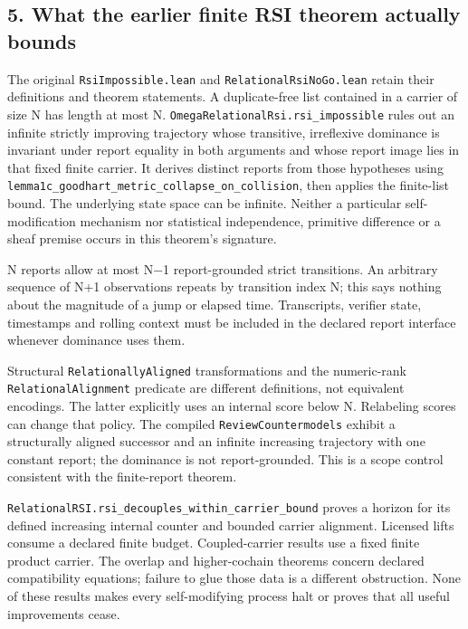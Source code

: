 \documentclass[
  10pt,
]{article}
\begin{document}
\subsection{5. What the earlier finite RSI theorem actually bounds}\label{what-the-earlier-finite-rsi-theorem-actually-bounds}

The original \texttt{RsiImpossible.lean} and \texttt{RelationalRsiNoGo.lean} retain their definitions and theorem statements. A duplicate-free list contained in a carrier of size N has length at most N. \texttt{OmegaRelationalRsi.rsi\_impossible} rules out an infinite strictly improving trajectory whose transitive, irreflexive dominance is invariant under report equality in both arguments and whose report image lies in that fixed finite carrier. It derives distinct reports from those hypotheses using \texttt{lemma1c\_goodhart\_metric\_collapse\_on\_collision}, then applies the finite-list bound. The underlying state space can be infinite. Neither a particular self-modification mechanism nor statistical independence, primitive difference or a sheaf premise occurs in this theorem's signature.

N reports allow at most N−1 report-grounded strict transitions. An arbitrary sequence of N+1 observations repeats by transition index N; this says nothing about the magnitude of a jump or elapsed time. Transcripts, verifier state, timestamps and rolling context must be included in the declared report interface whenever dominance uses them.

Structural \texttt{RelationallyAligned} transformations and the numeric-rank \texttt{RelationalAlignment} predicate are different definitions, not equivalent encodings. The latter explicitly uses an internal score below N. Relabeling scores can change that policy. The compiled \texttt{ReviewCountermodels} exhibit a structurally aligned successor and an infinite increasing trajectory with one constant report; the dominance is not report-grounded. This is a scope control consistent with the finite-report theorem.

\texttt{RelationalRSI.rsi\_decouples\_within\_carrier\_bound} proves a horizon for its defined increasing internal counter and bounded carrier alignment. Licensed lifts consume a declared finite budget. Coupled-carrier results use a fixed finite product carrier. The overlap and higher-cochain theorems concern declared compatibility equations; failure to glue those data is a different obstruction. None of these results makes every self-modifying process halt or proves that all useful improvements cease.
\end{document}
